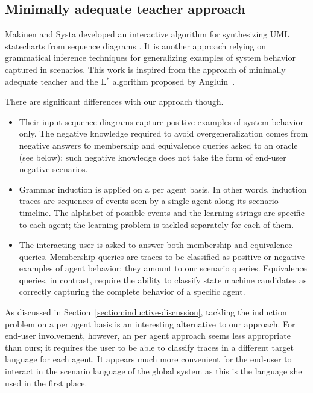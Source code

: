 \subsection{Minimally adequate teacher approach}

Makinen and Systa developed an interactive algorithm for synthesizing UML statecharts from sequence diagrams \cite{Makinen:2001}. It is another approach relying on grammatical inference techniques for generalizing examples of system behavior captured in scenarios. This work is inspired from the approach of minimally adequate teacher and the L$^*$ algorithm proposed by Angluin~\cite{Angluin:1987}. 

There are significant differences with our approach though.
\begin{itemize}

\item Their input sequence diagrams capture positive examples of system behavior only. The negative knowledge required to avoid overgeneralization comes from negative answers to membership and equivalence queries asked to an oracle (see below); such negative knowledge does not take the form of end-user negative scenarios.

\item Grammar induction is applied on a per agent basis. In other words, induction traces are sequences of events seen by a single agent along its scenario timeline. The alphabet of possible events and the learning strings are specific to each agent; the learning problem is tackled separately for each of them.

\item The interacting user is asked to answer both membership and equivalence queries. Membership queries are traces to be classified as positive or negative examples of agent behavior; they amount to our scenario queries. Equivalence queries, in contrast, require the ability to classify state machine candidates as correctly capturing the complete behavior of a specific agent.
\end{itemize}

As discussed in Section~\ref{section:inductive-discussion}, tackling the induction problem on a per agent basis is an interesting alternative to our approach. For end-user involvement, however, an per agent approach seems less appropriate than ours; it requires the user to be able to classify traces in a different target language for each agent. It appears much more convenient for the end-user to interact in the scenario language of the global system as this is the language she used in the first place.

